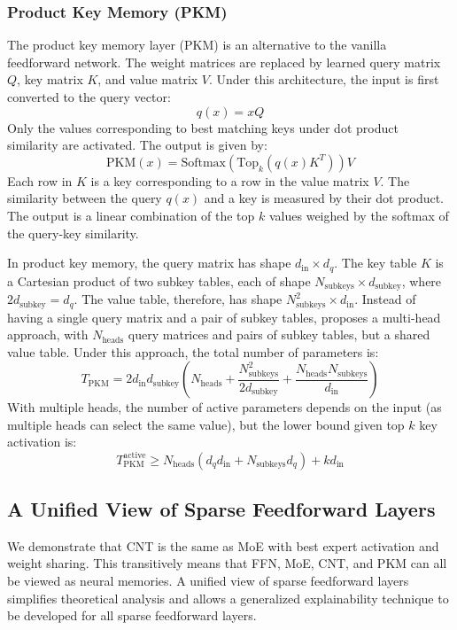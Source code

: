\subsubsection{Product Key Memory (PKM)}
The product key memory layer (PKM) \cite{lample_large_2019,wang_--fly_2020,rae_scaling_2016} is an alternative to the vanilla feedforward network. The weight matrices are replaced by learned query matrix $Q$, key matrix $K$, and value matrix $V$. Under this architecture, the input is first converted to the query vector:
\begin{equation}
    q(x) = xQ
\end{equation}
Only the values corresponding to best matching keys under dot product similarity are activated. The output is given by:
\begin{equation}
    \text{PKM}(x) = \text{Softmax}(\text{Top}_k(q(x)K^T))V
\end{equation}
Each row in $K$ is a key corresponding to a row in the value matrix $V$. The similarity between the query $q(x)$ and a key is measured by their dot product. The output is a linear combination of the top $k$ values weighed by the softmax of the query-key similarity.

In product key memory, the query matrix has shape $d_\text{in}\times d_q$. The key table $K$ is a Cartesian product of two subkey tables, each of shape $N_\text{subkeys}\times d_\text{subkey}$, where $2d_\text{subkey}=d_q$. The value table, therefore, has shape $N_\text{subkeys}^2\times d_\text{in}$. Instead of having a single query matrix and a pair of subkey tables, \cite{lample_large_2019} proposes a multi-head approach, with $N_\text{heads}$ query matrices and pairs of subkey tables, but a shared value table. Under this approach, the total number of parameters is: \begin{equation}
    T_\text{PKM} = 2d_\text{in}d_\text{subkey}(N_\text{heads}+\frac{N_\text{subkeys}^2}{2d_\text{subkey}}+\frac{N_\text{heads}N_\text{subkeys}}{d_\text{in}})
\end{equation}
With multiple heads, the number of active parameters depends on the input (as multiple heads can select the same value), but the lower bound given top $k$ key activation is: \begin{equation}
    T_\text{PKM}^\text{active} \ge N_\text{heads}(d_qd_\text{in} + N_\text{subkeys}d_q )+kd_\text{in}
\end{equation}



\subsection{A Unified View of Sparse Feedforward Layers}
\label{subsec:cnt-moe}
We demonstrate that CNT is the same as MoE with best expert activation and weight sharing. This transitively means that FFN, MoE, CNT, and PKM can all be viewed as neural memories. A unified view of sparse feedforward layers simplifies theoretical analysis and allows a generalized explainability technique to be developed for all sparse feedforward layers.

